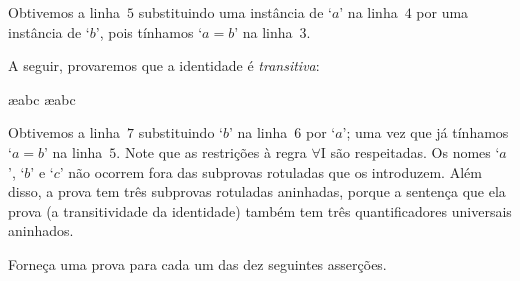  
\begin{fitchproof}
	\open
		\open
			\open
			\close
		\close
	\close
\end{fitchproof}
Obtivemos a linha~$5$ substituindo uma instância de `$a$' na linha~$4$ por uma instância de `$b$', pois tínhamos `$a= b$' na linha~$3$.

A seguir, provaremos que a identidade é  \emph{transitiva}:
\begin{fitchproof}
		\open
			\open
				\open
					\open
						\ae{abc}
						\ae{abc}
					\close
				\close
			\close
		\close
\end{fitchproof}
Obtivemos a linha~$7$ substituindo `$b$' na linha~$6$ por `$a$'; uma vez que já tínhamos `$a= b$' na linha~$5$.
Note que as restrições à regra $\forall$I são respeitadas. Os nomes `$a$', `$b$' e `$c$' não ocorrem fora das subprovas rotuladas que os introduzem.
Além disso, a prova tem três subprovas rotuladas aninhadas, porque a sentença que ela prova (a transitividade da identidade) também tem três quantificadores universais aninhados.

\practiceproblems
\problempart
\label{pr.identity}
Forneça uma prova para cada um das dez seguintes asserções.
   
